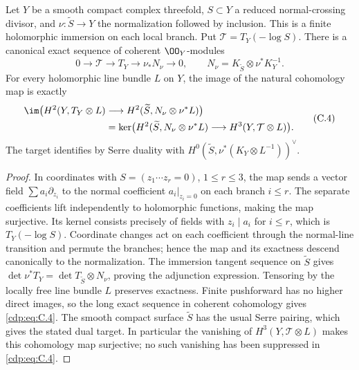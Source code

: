 
\begin{proposition}\label{cdp:st:C5a}
Let $Y$ be a smooth compact complex threefold, $S\subset Y$ a reduced normal-crossing divisor, and $\nu:\widetilde S\to Y$ the normalization followed by inclusion. This is a finite holomorphic immersion on each local branch. Put $\mathcal T=T_Y(-\log S)$. There is a canonical exact sequence of coherent $\OO_Y$-modules
\[
0\longrightarrow\mathcal T\longrightarrow T_Y
 \longrightarrow\nu_*N_\nu\longrightarrow0,
\qquad N_\nu=K_{\widetilde S}\otimes\nu^*K_Y^{-1}.      \tag{C.3}\label{cdp:eq:C.3}
\]
For every holomorphic line bundle $L$ on $Y$, the image of the natural cohomology map is exactly
\[
\begin{split}
\im\bigl(H^2(Y,T_Y\otimes L)&\longrightarrow
 H^2(\widetilde S,N_\nu\otimes\nu^*L)\bigr)\\
 &=\ker\bigl(H^2(\widetilde S,N_\nu\otimes\nu^*L)
 \longrightarrow H^3(Y,\mathcal T\otimes L)\bigr).
\end{split}                                             \tag{C.4}\label{cdp:eq:C.4}
\]
The target identifies by Serre duality with
$H^0(\widetilde S,\nu^*(K_Y\otimes L^{-1}))^\vee$.
\end{proposition}
\begin{proof}
In coordinates with $S=(z_1\cdots z_r=0)$, $1\le r\le3$, the map sends a vector field $\sum a_i\partial_{z_i}$ to the normal coefficient $a_i|_{z_i=0}$ on each branch $i\le r$. The separate coefficients lift independently to holomorphic functions, making the map surjective. Its kernel consists precisely of fields with $z_i\mid a_i$ for $i\le r$, which is $T_Y(-\log S)$. Coordinate changes act on each coefficient through the normal-line transition and permute the branches; hence the map and its exactness descend canonically to the normalization. The immersion tangent sequence on $\widetilde S$ gives $\det\nu^*T_Y=\det T_{\widetilde S}\otimes N_\nu$, proving the adjunction expression. Tensoring by the locally free line bundle $L$ preserves exactness. Finite pushforward has no higher direct images, so the long exact sequence in coherent cohomology gives \eqref{cdp:eq:C.4}. The smooth compact surface $\widetilde S$ has the usual Serre pairing, which gives the stated dual target. In particular the vanishing of $H^3(Y,\mathcal T\otimes L)$ makes this cohomology map surjective; no such vanishing has been suppressed in \eqref{cdp:eq:C.4}.
\end{proof}


